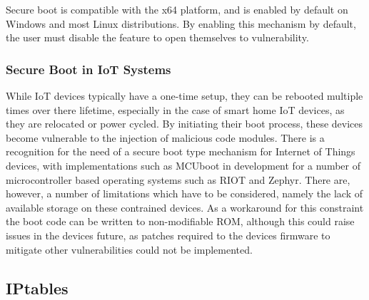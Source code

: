 Secure boot is compatible with the x64 platform, and is enabled by default on
Windows and most Linux distributions\cite{hoffman_2017}. By enabling this
mechanism by default, the user must disable the feature to open themselves to
vulnerability.

\subsubsection{Secure Boot in IoT Systems}

While IoT devices typically have a one-time setup, they can be rebooted multiple
times over there lifetime, especially in the case of smart home IoT devices, as
they are relocated or power cycled. By initiating their boot process, these
devices become vulnerable to the injection of malicious code modules. There is a
recognition for the need of a secure boot type mechanism for Internet of Things
devices, with implementations such as MCUboot in development for a number of
microcontroller based operating systems such as RIOT and
Zephyr\cite{juullabs-oss}. There are, however, a number of limitations which
have to be considered, namely the lack of available storage on these contrained
devices. As a workaround for this constraint the boot code can be written to
non-modifiable ROM, although this could raise issues in the devices future, as
patches required to the devices firmware to mitigate other vulnerabilities could
not be implemented\cite{iotSecurityFoundation}.

\subsection{IPtables}
